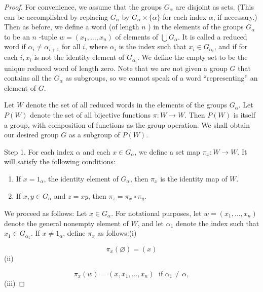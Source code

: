 \begin{proof}
For convenience, we assume that the groups \(G_{\alpha }\) are disjoint as sets. (This can be accomplished by replacing \(G_{\alpha }\) by \(G_{\alpha } \times \{ \alpha \}\) for each index \(\alpha\), if necessary.)
Then as before, we define a word (of length \(n\) ) in the elements of the groups \(G_{\alpha }\) to be an \(n\) -tuple \(w = ( {x_{1},\ldots ,x_{n}})\) of elements of \(\bigcup {G}_{\alpha }\). It is called a reduced word if \({\alpha }_{i} \neq {\alpha }_{i + 1}\) for all \(i\), where \({\alpha }_{i}\) is the index such that \(x_{i} \in {G}_{{\alpha }_{i}}\), and if for each \(i,x_{i}\) is not the identity element of \(G_{{\alpha }_{i}}\). We define the empty set to be the unique reduced word of length zero. Note that we are not given a group \(G\) that contains all the \(G_{\alpha }\) as subgroups, so we cannot speak of a word ``representing'' an element of \(G\).

Let \(W\) denote the set of all reduced words in the elements of the groups \(G_{\alpha }\). Let \(P( W)\) denote the set of all bijective functions \(\pi : W \rightarrow W\). Then \(P( W)\) is itself a group, with composition of functions as the group operation. We shall obtain our desired group \(G\) as a subgroup of \(P( W)\).

Step 1. For each index \(\alpha\) and each \(x \in {G}_{\alpha }\), we define a set map \({\pi }_{x} : W \rightarrow W\). It will satisfy the following conditions:

\begin{enumerate}[itemsep=0.2em, parsep=0pt, topsep=0pt, partopsep=0pt, leftmargin=*, label=(\arabic*), align=left]
\item If \(x = 1_{\alpha }\), the identity element of \(G_{\alpha }\), then \({\pi }_{x}\) is the identity map of \(W\).
\item If \(x,y \in {G}_{\alpha }\) and \(z = {xy}\), then \({\pi }_{z} = {\pi }_{x} \circ {\pi }_{y}\).
\end{enumerate}

We proceed as follows: Let \(x \in {G}_{\alpha }\). For notational purposes, let \(w = ( {x_{1},\ldots ,x_{n}})\) denote the general nonempty element of \(W\), and let \({\alpha }_{1}\) denote the index such that \(x_{1} \in {G}_{{\alpha }_{1}}\). If \(x \neq {1}_{\alpha }\), define \({\pi }_{x}\) as follows:(i)

\[
{\pi }_{x}( \varnothing ) = (x)
\]
(ii)

\[
{\pi }_{x}( w) = ( {x,x_{1},\ldots ,x_{n}}) \;\text{ if }{\alpha }_{1} \neq \alpha ,
\]
(iii)


\end{proof}
